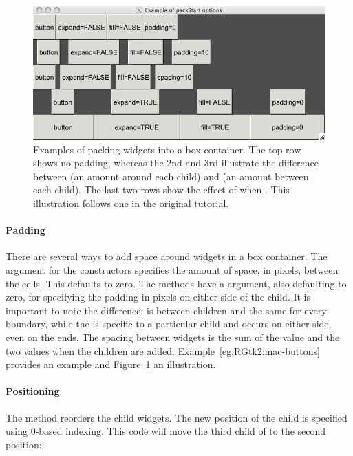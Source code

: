 \begin{figure}
  \centering
  \includegraphics[width=.8\textwidth]{ex-RGtk2-pack-start.png} 
  \caption{Examples of packing widgets into a box container. The top
    row shows no padding, whereas the 2nd and 3rd illustrate the
    difference between  (an amount around each child)
    and  (an amount between each child). The last two
    rows show the effect of  when . This
    illustration follows one in the original \GTK\/ tutorial.}
  \label{fig:RGtk2-pack-start}
\end{figure}

\paragraph{Padding}
There are several ways to add space around widgets in a box container.
The  argument for the constructors
specifies the amount of space, in pixels, between the cells. This
defaults to zero. The  methods have a
 argument, also defaulting to zero,
for specifying the padding in pixels on either side of the child. It
is important to note the difference:  is between
children and the same for every boundary, while the  is
specific to a particular child and occurs on either side, even on the
ends. The spacing between widgets is the sum of the 
value and the two  values when the children are added.
Example~\ref{eg:RGtk2:mac-buttons} provides an example and
Figure~\ref{fig:RGtk2-pack-start} an illustration.

\paragraph{Positioning}
The  method reorders the child
widgets. The new position of the child is specified using 0-based
indexing. This code will move the third child of  to the second position:
\begin{Schunk}
\end{Schunk}

